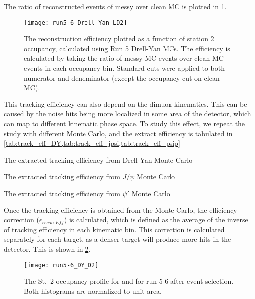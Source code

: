 \documentclass[../main.tex]{subfiles}
\begin{document}
The ratio of reconstructed events of messy over clean MC is plotted in \cref{fig:tracking efficiency}.
\begin{figure}[h!]
	\centering
	\texttt{[image: run5-6\_Drell-Yan\_LD2]}
	\caption{The reconstruction efficiency plotted as a function of station 2 occupancy, calculated using
		Run 5  Drell-Yan MCs.
		The efficiency is calculated by taking the ratio of messy MC events over clean MC events in each
		occupancy bin. Standard cuts were applied to both numerator and denominator
		(except the occupancy cut on clean MC).
	}
	\label{fig:tracking efficiency}
\end{figure}

This tracking efficiency can also depend on the dimuon kinematics. This can be caused
by the noise hits being more localized in some area of the detector, which can map to
different kinematic phase space. To study this effect, we repeat the study with different
Monte Carlo, and the extract efficiency is tabulated in \cref{tab:track_eff_DY,tab:track_eff_jpsi,tab:track_eff_psip}

\begin{table}
	\centering
	\caption{The extracted tracking efficiency from Drell-Yan Monte Carlo}
	\label{tab:track_eff_DY}
	
\end{table}
\begin{table}
	\centering
	\caption{The extracted tracking efficiency from $J/\psi$  Monte Carlo}
	\label{tab:track_eff_jpsi}
	
\end{table}
\begin{table}
	\centering
	\caption{The extracted tracking efficiency from $\psi'$ Monte Carlo}
	\label{tab:track_eff_psip}
	
\end{table}

Once the tracking efficiency is obtained from the Monte Carlo, the efficiency correction ($\epsilon_{recon.Eff}$)
is calculated, which is defined as the average of the inverse of tracking efficiency in each
kinematic bin. This correction is calculated separately for each target, as a denser target
will produce more hits in the detector. This is shown in \cref{fig:target_D2}.

\begin{figure}[h!]
	\centering
	\texttt{[image: run5-6\_DY\_D2]}
	\caption{The St.~2 occupancy profile for  and  for run 5-6 after event selection. Both histograms are normalized to unit area.
	}
	\label{fig:target_D2}
\end{figure}
\end{document}
